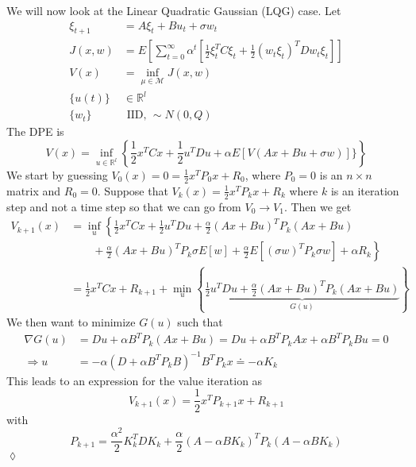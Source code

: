 \begin{example}
We will now look at the Linear Quadratic Gaussian (LQG) case. Let
\begin{align*}
\xi_{t+1} &= A\xi_t+Bu_t+\sigma w_t \\
J(x,w) &= E\left[\sum_{t=0}^\infty \alpha^t\left[\frac{1}{2}\xi_t^TC\xi_t + \frac{1}{2}(w_t\xi_t)^TDw_t\xi_t\right]\right] \\
V(x) &= \inf_{\mu\in\mathcal{M}}J(x,w) \\
\{u(t)\} &\in\mathbb{R}^l \\
\{w_t\} & \text{ IID, } \sim N(0,Q)
\end{align*}
The DPE is
$$V(x) = \inf_{u\in\mathbb{R}^l}\left\lbrace\frac{1}{2}x^TCx + \frac{1}{2}u^TDu + \alpha E[V(Ax+Bu+\sigma w)]\}\right\rbrace$$
We start by guessing $V_0(x)=0 = \frac{1}{2}x^TP_0x+R_0$, where $P_0=0$ is an $n\times n$ matrix and $R_0=0$. Suppose that $V_k(x) = \frac{1}{2}x^TP_kx+R_k$ where $k$ is an iteration step and not a time step so that we can go from $V_0\to V_1$. Then we get
\begin{align*}
V_{k+1}(x) &= \inf_u\left\lbrace\frac{1}{2}x^TCx+\frac{1}{2}u^TDu + \frac{\alpha}{2}(Ax+Bu)^TP_k(Ax+Bu) \right.\\
&\left.\qquad + \frac{\alpha}{2}(Ax+Bu)^TP_k\sigma E[w] + \frac{\alpha}{2}E[(\sigma w)^TP_k\sigma w] + \alpha R_k\right\rbrace \\
&= \frac{1}{2}x^TCx + R_{k+1} + \min_u\left\lbrace\underbrace{\frac{1}{2}u^TDu + \frac{\alpha}{2}(Ax+Bu)^TP_k(Ax+Bu)}_{G(u)}\right\rbrace
\end{align*}
We then want to minimize $G(u)$ such that
\begin{align*}
\nabla G(u) &= Du+\alpha B^TP_k(Ax+Bu) = Du + \alpha B^TP_kAx + \alpha B^TP_kBu = 0 \\
\Rightarrow u &= -\alpha(D+\alpha B^TP_kB)^{-1}B^TP_kx \doteq -\alpha K_k
\end{align*}
This leads to an expression for the value iteration as
$$V_{k+1}(x) = \frac{1}{2}x^TP_{k+1}x + R_{k+1}$$
with
$$P_{k+1} = \frac{\alpha^2}{2}K_k^TDK_k + \frac{\alpha}{2}(A-\alpha BK_k)^TP_k(A-\alpha BK_k)$$
$\lozenge$
\end{example}

